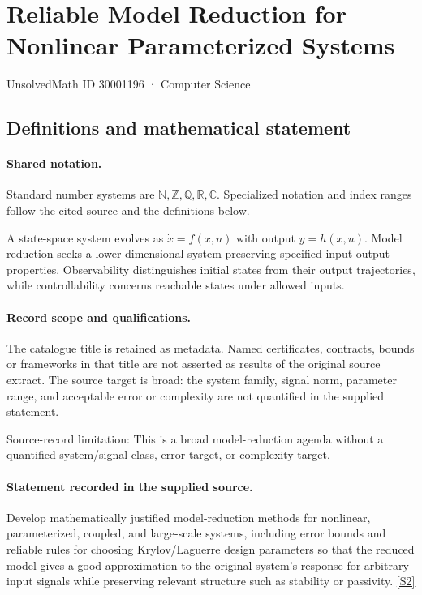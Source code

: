 \documentclass[11pt]{article}
\newcommand{\sref}[2]{\hyperlink{source:#1:#2}{[S#2]}}
\begin{document}
\setcounter{section}{30001195}
\section{Reliable Model Reduction for Nonlinear Parameterized Systems}\label{30001196}
{\small\sffamily UnsolvedMath ID 30001196 · Computer Science}
\subsection{Definitions and mathematical statement}

\paragraph{Shared notation.}Standard number systems are $\mathbb N,\mathbb Z,\mathbb Q,\mathbb R,\mathbb C$. Specialized notation and index ranges follow the cited source and the definitions below.


A state-space system evolves as $\dot x=f(x,u)$ with output $y=h(x,u)$. Model reduction seeks a lower-dimensional system preserving specified input-output properties. Observability distinguishes initial states from their output trajectories, while controllability concerns reachable states under allowed inputs.
\paragraph{Record scope and qualifications.}
The catalogue title is retained as metadata. Named certificates, contracts, bounds or frameworks in that title are not asserted as results of the original source extract.
The source target is broad: the system family, signal norm, parameter range, and acceptable error or complexity are not quantified in the supplied statement.

Source-record limitation: This is a broad model-reduction agenda without a quantified system/signal class, error target, or complexity target.
\paragraph{Statement recorded in the supplied source.}
Develop mathematically justified model-reduction methods for nonlinear, parameterized, coupled, and large-scale systems, including error bounds and reliable rules for choosing Krylov/Laguerre design parameters so that the reduced model gives a good approximation to the original system's response for arbitrary input signals while preserving relevant structure such as stability or passivity. \sref{30001196}{2}
\end{document}
